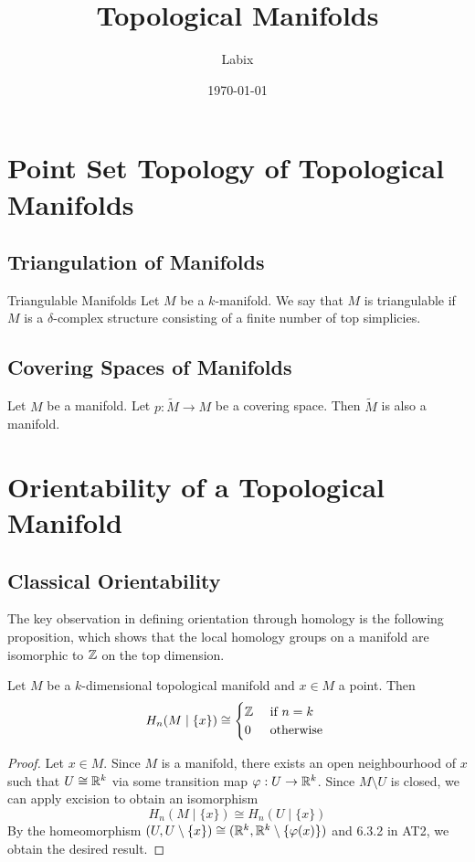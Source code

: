 \documentclass[a4paper]{article}
\title{Topological Manifolds}
\author{Labix}
\date{\today}
\begin{document}
\maketitle
\begin{abstract}
\end{abstract}
\pagebreak
\tableofcontents
\pagebreak

\section{Point Set Topology of Topological Manifolds}
\subsection{Triangulation of Manifolds}
\begin{defn}{Triangulable Manifolds}{} Let $M$ be a $k$-manifold. We say that $M$ is triangulable if $M$ is a $\delta$-complex structure consisting of a finite number of top simplicies. 
\end{defn}

\subsection{Covering Spaces of Manifolds}
\begin{prp}{}{} Let $M$ be a manifold. Let $p:\tilde{M}\to M$ be a covering space. Then $\tilde{M}$ is also a manifold. 
\end{prp}

\pagebreak
\section{Orientability of a Topological Manifold}
\subsection{Classical Orientability}
The key observation in defining orientation through homology is the following proposition, which shows that the local homology groups on a manifold are isomorphic to $\mathbb{Z}$ on the top dimension. 

\begin{prp}{}{} Let $M$ be a $k$-dimensional topological manifold and $x\in M$ a point. Then $$H_n(M\;|\;\{x\})\cong\begin{cases}
\mathbb{Z} & \text{ if } n=k\\
0 & \text{ otherwise }
\end{cases}$$ \tcbline
\begin{proof}
Let $x\in M$. Since $M$ is a manifold, there exists an open neighbourhood of $x$ such that $U\cong\mathbb{R}^k$ via some transition map $\varphi:U\to\mathbb{R}^k$. Since $M\setminus U$ is closed, we can apply excision to obtain an isomorphism $$H_n(M\;|\;\{x\})\cong H_n(U\;|\;\{x\})$$ By the homeomorphism $(U,U\setminus\{x\})\cong(\mathbb{R}^k,\mathbb{R}^k\setminus\{\varphi(x)\})$ and 6.3.2 in AT2, we obtain the desired result. 
\end{proof}
\end{prp}
\end{document}
